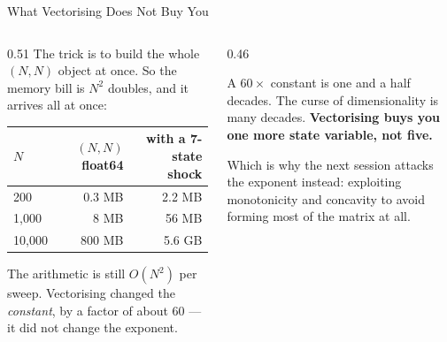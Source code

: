 \begin{frame}{What Vectorising Does Not Buy You}
\begin{columns}[T]
\begin{column}{0.51\textwidth}
\small
The trick is to build the whole $(N,N)$ object at once. So the memory bill is $N^2$ doubles, and it arrives all at once:
\medskip
\begin{center}\footnotesize
\begin{tabular}{@{}lrr@{}}
\toprule
$N$ & $(N,N)$ float64 & with a 7-state shock \\
\midrule
200 & 0.3 MB & 2.2 MB \\
1{,}000 & 8 MB & 56 MB \\
10{,}000 & 800 MB & 5.6 GB \\
\bottomrule
\end{tabular}
\end{center}
\medskip
The arithmetic is still $O(N^2)$ per sweep. Vectorising changed the \emph{constant}, by a factor of about 60 --- it did not change the exponent.
\end{column}
\begin{column}{0.46\textwidth}
\begin{cautionbox}[title=\textbf{The honest limit}]\footnotesize
A $60\times$ constant is one and a half decades. The curse of dimensionality is many decades. \textbf{Vectorising buys you one more state variable, not five.}
\end{cautionbox}
\medskip
\begin{takeawaybox}\footnotesize
Which is why the next session attacks the exponent instead: exploiting monotonicity and concavity to avoid forming most of the matrix at all.
\end{takeawaybox}
\end{column}
\end{columns}
\end{frame}

